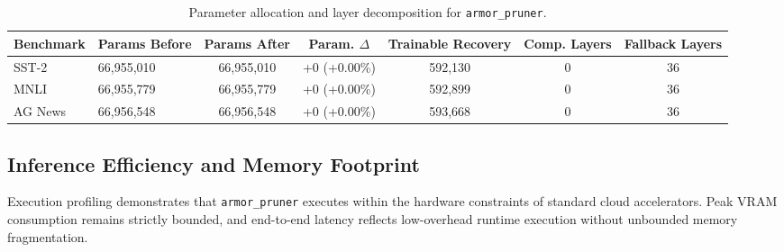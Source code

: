 \begin{table}[t]
\centering
\small
\begin{tabular}{llccccc}
\toprule
\textbf{Benchmark} & \textbf{Params Before} & \textbf{Params After} & \textbf{Param. $\Delta$} & \textbf{Trainable Recovery} & \textbf{Comp. Layers} & \textbf{Fallback Layers} \\
\midrule
SST-2 & 66,955,010 & 66,955,010 & +0 (+0.00\%) & 592,130 & 0 & 36 \\
MNLI & 66,955,779 & 66,955,779 & +0 (+0.00\%) & 592,899 & 0 & 36 \\
AG News & 66,956,548 & 66,956,548 & +0 (+0.00\%) & 593,668 & 0 & 36 \\
\bottomrule
\end{tabular}
\caption{Parameter allocation and layer decomposition for \texttt{armor\_pruner}.}
\label{tab:params\_armor\_pruner}
\end{table}

\subsection{Inference Efficiency and Memory Footprint}
Execution profiling demonstrates that \texttt{armor\_pruner} executes within the hardware constraints of standard cloud accelerators. Peak VRAM consumption remains strictly bounded, and end-to-end latency reflects low-overhead runtime execution without unbounded memory fragmentation.
